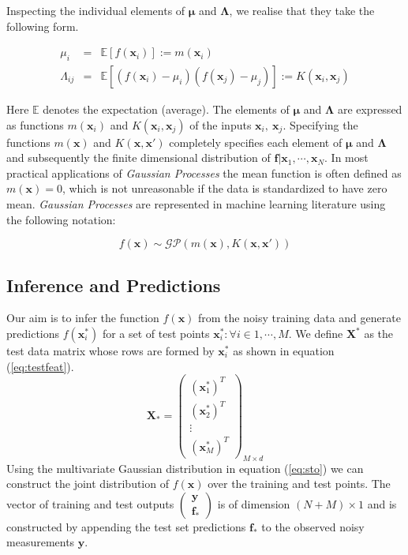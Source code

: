 \documentclass[draft,sw]{AGUTeX}
\begin{document}
\begin{article}
Inspecting the individual elements of $\mathbf{\mu}$ and $\mathbf{\Lambda}$, we realise that they take the following form.

\begin{align}
      \mu_i & = & \mathbb{E}[f(\mathbf{x}_i)] := m(\mathbf{x}_i) \\
      \Lambda_{ij} & = & \mathbb{E}[(f(\mathbf{x}_i) - \mu_i)(f(\mathbf{x}_j) - \mu_j)] := K(\mathbf{x}_i, \mathbf{x}_j)
\end{align}

Here $\mathbb{E}$ denotes the expectation (average). The elements of $\mathbf{\mu}$ and $\mathbf{\Lambda}$ are expressed as functions $m(\mathbf{x}_i)$ and $K(\mathbf{x}_i, \mathbf{x}_j)$ of the inputs $\mathbf{x}_i,\ \mathbf{x}_j$. Specifying the functions $m(\mathbf{x})$ and $K(\mathbf{x}, \mathbf{x}')$ completely specifies each element of $\mathbf{\mu}$ and $\mathbf{\Lambda}$ and subsequently the finite dimensional distribution of $\mathbf{f} | \mathbf{x}_1, \cdots, \mathbf{x}_N $. In most practical applications of \emph{Gaussian Processes} the mean function is often defined as $m(\mathbf{x}) = 0$, which is not unreasonable if the data is standardized to have zero mean. \emph{Gaussian Processes} are represented in machine learning literature using the following notation:

\begin{equation}
    f(\mathbf{x}) \sim \mathcal{GP}(m(\mathbf{x}), K(\mathbf{x}, \mathbf{x}'))
\end{equation}

\subsection{Inference and Predictions} \label{sec:inference}

Our aim is to infer the function $f(\mathbf{x})$ from the noisy training data and generate predictions $f(\mathbf{x}^{*}_i)$ for a set of test points $ {\mathbf{x}^{*}_i : \forall i \in 1, \cdots, M} $. We define $\mathbf{X}^*$ as the test data matrix whose rows are formed by $\mathbf{x}^{*}_i$ as shown in equation (\ref{eq:testfeat}). 
\begin{equation}
    \mathbf{X}_* = \left( \begin{array}{c} (\mathbf{x}^{*}_1)^T \\ (\mathbf{x}^{*}_2)^T \\ \vdots \\ (\mathbf{x}^{*}_M)^T \end{array} \right)_{M \times d} \label{eq:testfeat} 
\end{equation}
Using the multivariate Gaussian distribution in equation (\ref{eq:sto}) we can construct the joint distribution of $f(\mathbf{x})$ over the training and test points. The vector of training and test outputs $\left( \begin{array}{c} \mathbf{y} \\ \mathbf{f_*} \end{array} \right)$ is of dimension $(N+M) \times 1$ and is constructed by appending the test set predictions $\mathbf{f}_*$ to the observed noisy measurements $\mathbf{y}$.


\end{article}
\end{document}
